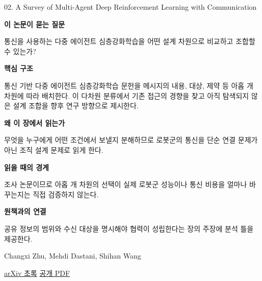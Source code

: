 \documentclass[11pt,openany]{book}
\begin{document}
\begin{termcard}{02. A Survey of Multi-Agent Deep Reinforcement Learning with Communication}

\par

\medskip

{\sffamily\bfseries\color{deepblue} 이 논문이 묻는 질문}\par

통신을 사용하는 다중 에이전트 심층강화학습을 어떤 설계 차원으로 비교하고 조합할 수 있는가?

\smallskip

{\sffamily\bfseries\color{deepblue} 핵심 구조}\par

통신 기반 다중 에이전트 심층강화학습 문헌을 메시지의 내용, 대상, 제약 등 아홉 개 차원에 따라 배치한다. 이 다차원 분류에서 기존 접근의 경향을 찾고 아직 탐색되지 않은 설계 조합을 향후 연구 방향으로 제시한다.

\smallskip

{\sffamily\bfseries\color{deepblue} 왜 이 장에서 읽는가}\par

무엇을 누구에게 어떤 조건에서 보낼지 분해하므로 로봇군의 통신을 단순 연결 문제가 아닌 조직 설계 문제로 읽게 한다.

\smallskip

{\sffamily\bfseries\color{coral} 읽을 때의 경계}\par

조사 논문이므로 아홉 개 차원의 선택이 실제 로봇군 성능이나 통신 비용을 얼마나 바꾸는지는 직접 검증하지 않는다.

\smallskip

{\sffamily\bfseries\color{teal} 원책과의 연결}\par

공유 정보의 범위와 수신 대상을 명시해야 협력이 성립한다는 장의 주장에 분석 틀을 제공한다.

\medskip

{\footnotesize\color{muted} Changxi Zhu, Mehdi Dastani, Shihan Wang\par

\href{https://arxiv.org/abs/2203.08975}{arXiv 초록} \quad \href{https://arxiv.org/pdf/2203.08975}{공개 PDF}\par}

\end{termcard}
\end{document}
